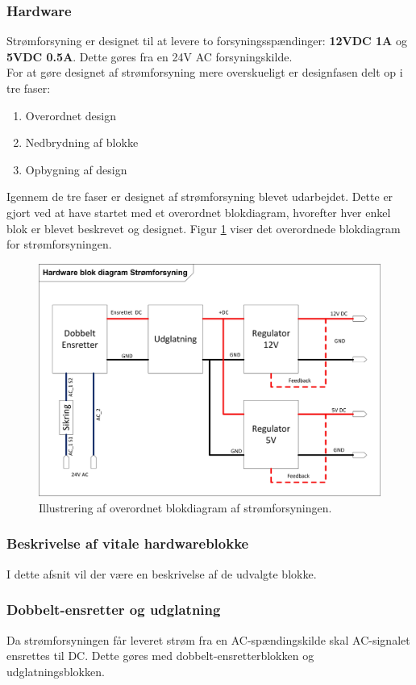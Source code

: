 \subsubsection{Hardware}
Strømforsyning er designet til at levere to forsyningsspændinger: \textbf{12VDC 1A} og \textbf{5VDC 0.5A}. Dette gøres fra en 24V AC forsyningskilde. \\
For at gøre designet af strømforsyning mere overskueligt er designfasen delt op i tre faser:
\begin{enumerate}
\item Overordnet design
\item Nedbrydning af blokke
\item Opbygning af design
\end{enumerate}
Igennem de tre faser er designet af strømforsyning blevet udarbejdet. Dette er gjort ved at have startet med et overordnet blokdiagram, hvorefter hver enkel blok er blevet beskrevet og designet. Figur \ref{fig:PowerSupplyBlok} viser det overordnede blokdiagram for strømforsyningen.\\
\begin{figure}[H]
\centering
\includegraphics[scale=1]{billeder/PowerSupplyBlok}
\caption{Illustrering af overordnet blokdiagram af strømforsyningen.}
\label{fig:PowerSupplyBlok}
\end{figure}

\subsubsection{Beskrivelse af vitale hardwareblokke}
I dette afsnit vil der være en beskrivelse af de udvalgte blokke.

\subsubsection{Dobbelt-ensretter og udglatning}
Da strømforsyningen får leveret strøm fra en AC-spændingskilde skal AC-signalet ensrettes til DC. Dette gøres med dobbelt-ensretterblokken og udglatningsblokken. 

